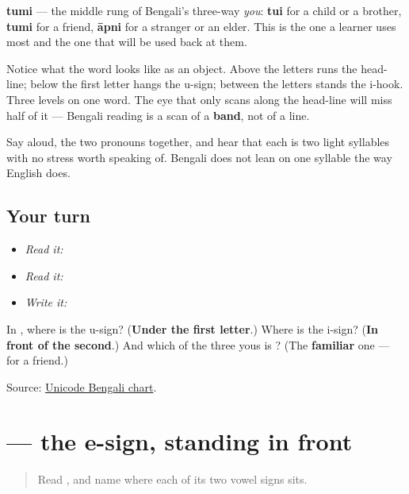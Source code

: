 \textbf{tumi} — the middle rung of Bengali's three-way \emph{you}: \textbf{tui} for a child or a brother, \textbf{tumi} for a friend, \textbf{āpni} for a stranger or an elder. This is the one a learner uses most and the one that will be used back at them.

Notice what the word looks like as an object. Above the letters runs the head-line; below the first letter hangs the u-sign; between the letters stands the i-hook. Three levels on one word. The eye that only scans along the head-line will miss half of it — Bengali reading is a scan of a \textbf{band}, not of a line.

Say \textbf{ } aloud, the two pronouns together, and hear that each is two light syllables with no stress worth speaking of. Bengali does not lean on one syllable the way English does.

\subsection*{Your turn}
\begin{itemize}
\raggedright
  \item \emph{Read it:} 
  \item \emph{Read it:} 
  \item \emph{Write it:} 
\end{itemize}

\begin{tcolorbox}[breakable,colback=teal!4,colframe=teal!35!black,title={Before you move on}]
In \textbf{}, where is the u-sign? (\textbf{Under the first letter}.) Where is the i-sign? (\textbf{In front of the second}.) And which of the three yous is \textbf{}? (The \textbf{familiar} one — for a friend.)

Source: \href{https://www.unicode.org/charts/PDF/U0980.pdf}{Unicode Bengali chart}.
\end{tcolorbox}
\section[-e]{ — the e-sign, standing in front}

\label{lesson:BN-W02-e-matra}



\begin{quote}
Read \textbf{}, and name where each of its two vowel signs sits.
\end{quote}

